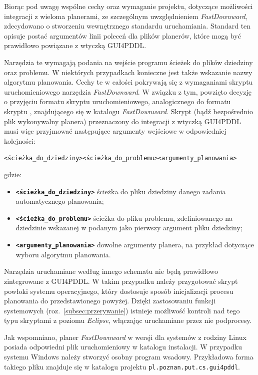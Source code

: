 Biorąc pod uwagę wspólne cechy  oraz wymaganie projektu, dotyczące możliwości integracji z wieloma planerami, ze szczególnym uwzględnieniem \emph{FastDownward}, zdecydowano o stworzeniu wewnętrznego standardu uruchamiania. Standard ten opisuje postać argumentów linii poleceń dla plików planerów, które mogą być prawidłowo powiązane z wtyczką GUI4PDDL. 

Narzędzia te wymagają podania na wejście programu ścieżek do plików dziedziny oraz problemu. W niektórych przypadkach konieczne jest także wskazanie nazwy algorytmu planowania. Cechy te w całości pokrywają się z wymaganiami skryptu uruchomieniowego narzędzia \emph{FastDownward}. W związku z tym, powzięto decyzję o przyjęciu formatu skryptu uruchomieniowego, analogicznego do formatu skryptu , znajdującego się w katalogu  \emph{FastDownward}. Skrypt (bądź bezpośrednio plik wykonywalny planera) przeznaczony do integracji z wtyczką GUI4PDDL musi więc przyjmować następujące argumenty wejściowe w odpowiedniej kolejności:

\noindent
\centerline{\texttt{<ścieżka\_do\_dziedziny>}\textvisiblespace\texttt{<ścieżka\_do\_problemu>}\textvisiblespace\texttt{<argumenty\_planowania>}}


\noindent
gdzie:
\begin{itemize}
\item \textbf{\texttt{<ścieżka\_do\_dziedziny>}}  ścieżka do pliku dziedziny danego zadania automatycznego planowania;
\item \textbf{\texttt{<ścieżka\_do\_problemu>}} ścieżka do pliku problemu, zdefiniowanego na dziedzinie wskazanej w podanym jako pierwszy argument pliku dziedziny;
\item \textbf{\texttt{<argumenty\_planowania>}} dowolne argumenty planera, na przykład dotyczące wyboru algorytmu planowania.
\end{itemize}
Narzędzia uruchamiane według innego schematu nie będą prawidłowo zintegrowane z GUI4PDDL. W takim przypadku należy przygotować skrypt powłoki systemu operacyjnego, który dostosuje sposób inicjalizacji procesu planowania do przedstawionego powyżej. Dzięki zastosowaniu funkcji systemowych (roz.~\ref{subsec:przerywanie}) istnieje możliwość kontroli nad tego typu skryptami z poziomu \emph{Eclipse}, włączając uruchamiane przez nie podprocesy.

Jak wspomniano, planer \emph{FastDownward} w wersji dla systemów z rodziny Linux posiada odpowiedni plik uruchomieniowy w katalogu  instalacji. W przypadku systemu Windows należy stworzyć osobny program wsadowy. Przykładowa forma takiego pliku znajduje się w katalogu  projektu \texttt{pl.poznan.put.cs.gui4pddl}.

